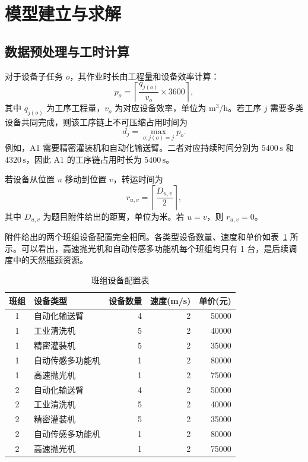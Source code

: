 \section{模型建立与求解}

\subsection{数据预处理与工时计算}

对于设备子任务 $o$，其作业时长由工程量和设备效率计算：
\begin{equation}
  p_o=\left\lceil \frac{q_{j(o)}}{v_o}\times 3600 \right\rceil ,
  \label{eq:duration}
\end{equation}
其中 $q_{j(o)}$ 为工序工程量，$v_o$ 为对应设备效率，单位为 $\mathrm{m^3/h}$。若工序 $j$ 需要多类设备共同完成，则该工序链上不可压缩占用时间为
\begin{equation}
  d_j=\max_{o:j(o)=j} p_o .
  \label{eq:job-duration}
\end{equation}
例如，A1 需要精密灌装机和自动化输送臂。二者对应持续时间分别为 $5400\,\mathrm{s}$ 和 $4320\,\mathrm{s}$，因此 A1 的工序链占用时长为 $5400\,\mathrm{s}$。

若设备从位置 $u$ 移动到位置 $v$，转运时间为
\begin{equation}
  r_{u,v}=\left\lceil \frac{D_{u,v}}{2}\right\rceil ,
  \label{eq:travel}
\end{equation}
其中 $D_{u,v}$ 为题目附件给出的距离，单位为米。若 $u=v$，则 $r_{u,v}=0$。

附件给出的两个班组设备配置完全相同。各类型设备数量、速度和单价如表~\ref{tab:equipment} 所示。可以看出，高速抛光机和自动传感多功能机每个班组均只有 1 台，是后续调度中的天然瓶颈资源。

\begin{table}[!htbp]
  \centering
  \caption{班组设备配置表}
  \label{tab:equipment}
  \renewcommand{\arraystretch}{1.2}
  \begin{tabularx}{\textwidth}{c X r r r}
    \toprule
    班组 & 设备类型 & 设备数量 & 速度(m/s) & 单价(元) \\
    \midrule
    1 & 自动化输送臂 & 4 & 2 & 50000 \\
    1 & 工业清洗机 & 5 & 2 & 40000 \\
    1 & 精密灌装机 & 5 & 2 & 35000 \\
    1 & 自动传感多功能机 & 1 & 2 & 80000 \\
    1 & 高速抛光机 & 1 & 2 & 75000 \\
    2 & 自动化输送臂 & 4 & 2 & 50000 \\
    2 & 工业清洗机 & 5 & 2 & 40000 \\
    2 & 精密灌装机 & 5 & 2 & 35000 \\
    2 & 自动传感多功能机 & 1 & 2 & 80000 \\
    2 & 高速抛光机 & 1 & 2 & 75000 \\
    \bottomrule
  \end{tabularx}
\end{table}

